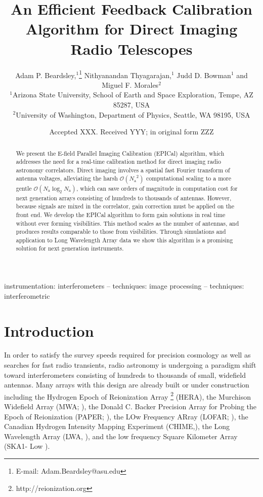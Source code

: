 \documentclass[a4paper,fleqn,usenatbib]{mnras}
\title[EPICal]{An Efficient Feedback Calibration Algorithm for Direct Imaging Radio Telescopes
}
\author[Beardsley et al.]{
Adam P. Beardsley,$^{1}$\thanks{E-mail: Adam.Beardsley@asu.edu}
Nithyanandan Thyagarajan,$^{1}$
Judd D. Bowman$^{1}$
\newauthor
and Miguel F. Morales$^{2}$
\\
$^{1}$Arizona State University, School of Earth and Space Exploration, Tempe, AZ 85287, USA\\
$^{2}$University of Washington, Department of Physics, Seattle, WA 98195, USA\\
}
\date{Accepted XXX. Received YYY; in original form ZZZ}
\newcommand{\Nant}{\ensuremath{N_{\mathrm{a}}}}
\begin{document}
\label{firstpage}
\pagerange{\pageref{firstpage}--\pageref{lastpage}}
\maketitle

\begin{abstract}
We present the E-field Parallel Imaging Calibration (EPICal) algorithm, which addresses the 
need for a real-time calibration method for direct imaging radio astronomy correlators. Direct 
imaging involves a spatial fast Fourier transform of antenna voltages, alleviating the harsh 
$\mathcal{O}(\Nant^2)$ computational scaling to a more gentle $\mathcal{O}(\Nant \log_2 
\Nant)$, which can save orders of magnitude in computation cost for next generation arrays 
consisting of hundreds to thousands of antennas. However, because signals are mixed in the 
correlator, gain correction must be applied on the front end. We develop the EPICal algorithm 
to form gain solutions in real time without ever forming visibilities. This method scales as the 
number of antennas, and produces results comparable to those from visibilities. Through 
simulations and application to Long Wavelength Array data we show this algorithm is a 
promising solution for next generation instruments.
\end{abstract}

\begin{keywords}
instrumentation: interferometers -- techniques: image processing -- techniques: interferometric
\end{keywords}



\section{Introduction}
In order to satisfy the survey speeds required for precision cosmology as well as searches for 
fast radio transients, radio astronomy is undergoing a paradigm shift toward interferometers 
consisting of hundreds to thousands of small, widefield antennas. Many arrays with this design 
are already built or under construction including the Hydrogen Epoch of Reionization Array
\footnote{http://reionization.org} (HERA), the Murchison Widefield Array (MWA; 
\citealt{tin13,bow13}), the Donald C. Backer Precision Array for Probing the Epoch of 
Reionization (PAPER; \citealt{par10}), the LOw Frequency ARray (LOFAR; \citealt{van13}), the 
Canadian Hydrogen Intensity Mapping Experiment (CHIME,\citealt{ban14}), the Long 
Wavelength Array (LWA, \citealt{ell13}), and the low frequency Square Kilometer Array (SKA1-
Low \citealt{mel13}).
\end{document}
